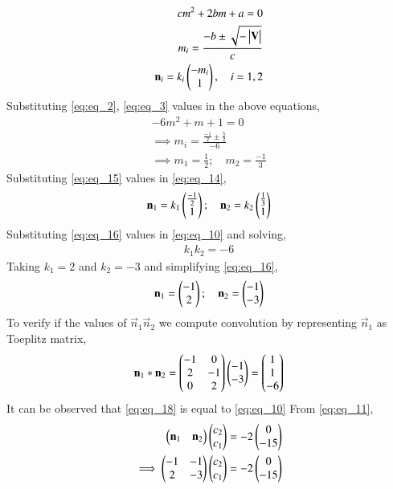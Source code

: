 \documentclass[journal,12pt,twocolumn]{IEEEtran}
\begin{document}
\begin{align}
    cm^2+2bm+a=0 \nonumber \\
    m_i = \frac{-b\pm \sqrt{-\begin{vmatrix}\mathbf{V}\end{vmatrix}}}{c} \label{eq:eq_13} \\
    \mathbf{n}_i = k_i\begin{pmatrix}-m_i \\ 1\end{pmatrix}, \quad i=1,2 \label{eq:eq_14}
\end{align}
Substituting \eqref{eq:eq_2}, \eqref{eq:eq_3} values in the above equations,
\begin{align}
    -6m^2+m+1=0 \nonumber \\
    \implies m_i = \frac{\frac{-1}{2}\pm \frac{5}{2}}{-6} \nonumber \\
    \implies m_1 = \frac{1}{2}; \quad m_2 = \frac{-1}{3} \label{eq:eq_15}
\end{align}
Substituting \eqref{eq:eq_15} values in \eqref{eq:eq_14},
\begin{align}
    \mathbf{n}_1=k_1\begin{pmatrix}\frac{-1}{2} \\ 1\end{pmatrix}; \quad \mathbf{n}_2=k_2\begin{pmatrix}\frac{1}{3} \\ 1\end{pmatrix} \label{eq:eq_16}
\end{align}
Substituting \eqref{eq:eq_16} values in \eqref{eq:eq_10} and solving,
\begin{align}
    k_1k_2=-6 \nonumber
\end{align}
Taking $k_1 = 2$ and $k_2 = -3$ and simplifying \eqref{eq:eq_16},
\begin{align} \label{eq:eq_17}
    \mathbf{n}_1 = \begin{pmatrix}-1 \\ 2\end{pmatrix}; \quad \mathbf{n}_2 = \begin{pmatrix}-1 \\ -3\end{pmatrix} 
\end{align}
To verify if the values of $\vec{n}_1 \vec{n}_2$ we compute convolution by representing $\vec{n}_1$ as Toeplitz matrix,
\begin{align}
    \mathbf{n}_1*\mathbf{n}_2=\begin{pmatrix}-1 & 0 \\ 2 & -1 \\ 0 & 2\end{pmatrix}\begin{pmatrix}-1 \\ -3\end{pmatrix} = \begin{pmatrix}1 \\ 1 \\ -6\end{pmatrix} \label{eq:eq_18}
\end{align}
It can be observed that \eqref{eq:eq_18} is equal to \eqref{eq:eq_10}
From \eqref{eq:eq_11},
\begin{align}
    \begin{pmatrix}\mathbf{n}_1 & \mathbf{n}_2\end{pmatrix}\begin{pmatrix}c_2 \\ c_1\end{pmatrix} = -2\begin{pmatrix}0 \\ -15\end{pmatrix} \nonumber \\
    \implies \begin{pmatrix}-1 & -1 \\ 2 & -3\end{pmatrix}\begin{pmatrix}c_2 \\ c_1\end{pmatrix} = -2\begin{pmatrix}0 \\ -15\end{pmatrix} \label{eq:eq_19}
\end{align}
\end{document}
